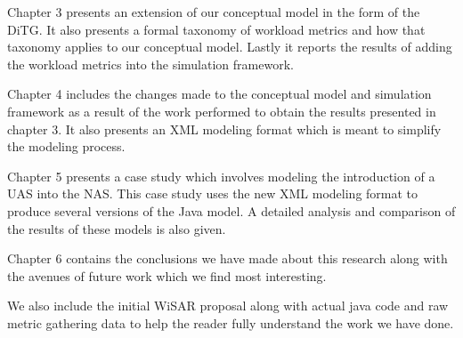 Chapter 3 presents an extension of our conceptual model in the form of the DiTG.  It also presents a formal taxonomy of workload metrics and how that taxonomy applies to our conceptual model.  Lastly it reports the results of adding the workload metrics into the simulation framework.

Chapter 4 includes the changes made to the conceptual model and simulation framework as a result of the work performed to obtain the results presented in chapter 3.  It also presents an XML modeling format which is meant to simplify the modeling process.

Chapter 5 presents a case study which involves modeling the introduction of a UAS into the NAS.  This case study uses the new XML modeling format to produce several versions of the Java model.  A detailed analysis and comparison of the results of these models is also given.

Chapter 6 contains the conclusions we have made about this research along with the avenues of future work which we find most interesting.

We also include the initial WiSAR proposal along with actual java code and raw metric gathering data to help the reader fully understand the work we have done.